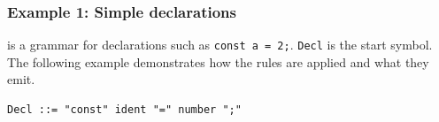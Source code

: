 \documentclass[]{report}
\begin{document}
\subsubsection{Example 1: Simple declarations}

 is a grammar for declarations such as \texttt{const a = 2;}. \texttt{Decl} is the start symbol. The following example demonstrates how the rules are applied and what they emit.

\begin{listing}[H]
\begin{verbatim}
Decl ::= "const" ident "=" number ";"
\end{verbatim}
\caption{Simple declaration grammar in Backus-Naur form.}
\label{lst:cfg-mapping-decl-bnf}
\end{listing}
\end{document}
